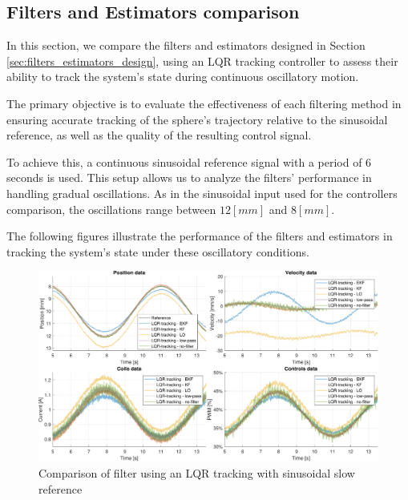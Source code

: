 \subsection{Filters and Estimators comparison}
\label{subsec:comparison_filters}

In this section, we compare the filters and estimators designed in Section \ref{sec:filters_estimators_design}, using an LQR tracking controller to assess their ability to track the system's state during continuous oscillatory motion.

The primary objective is to evaluate the effectiveness of each filtering method in ensuring accurate tracking of the sphere's trajectory relative to the sinusoidal reference, as well as the quality of the resulting control signal.

To achieve this, a continuous sinusoidal reference signal with a period of 6 seconds is used.
This setup allows us to analyze the filters' performance in handling gradual oscillations.
As in the sinusoidal input used for the controllers comparison, the oscillations range between $12 [mm]$ and $8 [mm]$.

The following figures illustrate the performance of the filters and estimators in tracking the system's state under these oscillatory conditions.

\begin{figure}[H]
    \centering
    \includegraphics[width=1\linewidth]{./img/MATLAB/results/sinusoidal_slow_linear_star_star.pdf}
    \caption{Comparison of filter using an LQR tracking with sinusoidal slow reference}
\end{figure}


